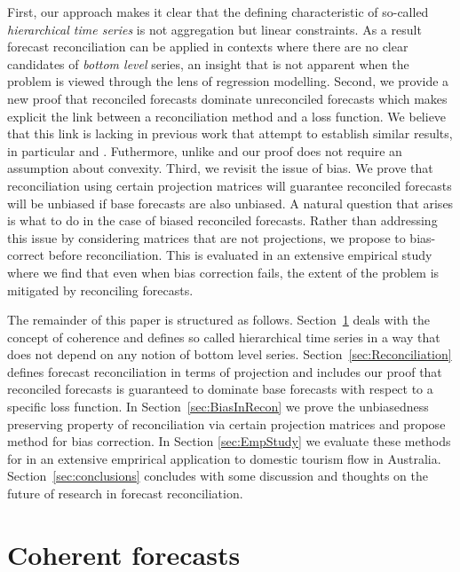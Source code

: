 \documentclass[12pt]{article}
\theoremstyle{definition}
\theoremstyle{property}
\begin{document}
	First, our approach makes it clear that the defining characteristic of so-called {\em hierarchical time series} is not aggregation but linear constraints.  As a result forecast reconciliation can be applied in contexts where there are no clear candidates of {\em bottom level} series, an insight that is not apparent when the problem is viewed through the lens of regression modelling.  Second, we provide a new proof that reconciled forecasts dominate unreconciled forecasts which makes explicit the link between a reconciliation method and a loss function.  We believe that this link is lacking in previous work that attempt to establish similar results, in particular \cite{VanErven2015a} and \cite{WicEtAl2019}.  Futhermore, unlike \cite{VanErven2015a} and \cite{WicEtAl2019} our proof does not require an assumption about convexity.  Third, we revisit the issue of bias.  We prove that reconciliation using certain projection matrices will guarantee reconciled forecasts will be unbiased if base forecasts are also unbiased.  A natural question that arises is what to do in the case of biased reconciled forecasts.  Rather than addressing this issue by considering matrices that are not projections, we propose to bias-correct before reconciliation.  This is evaluated in an extensive empirical study where we find that even when bias correction fails, the extent of the problem is mitigated by reconciling forecasts.
	     
	
	The remainder of this paper is structured as follows. Section~\ref{sec:CoheForecasts} deals with the concept of coherence and defines so called hierarchical time series in a way that does not depend on any notion of bottom level series.  Section~\ref{sec:Reconciliation} defines forecast reconciliation in terms of projection and includes our proof that reconciled forecasts is guaranteed to dominate base forecasts with respect to a specific loss function. In Section~\ref{sec:BiasInRecon} we prove the unbiasedness preserving property of reconciliation via certain projection matrices and propose method for bias correction. In Section \ref{sec:EmpStudy} we evaluate these methods for in an extensive emprirical application to domestic tourism flow in Australia.  Section~\ref{sec:conclusions} concludes with some discussion and thoughts on the  future of research in forecast reconciliation.  
\section{Coherent forecasts}\label{sec:CoheForecasts}
	
\end{document}
